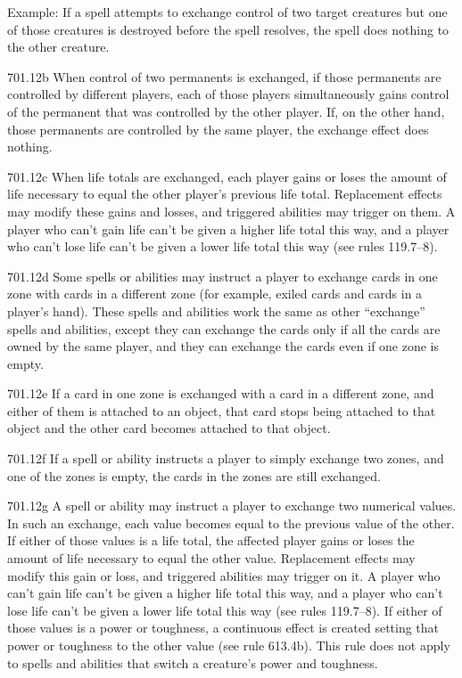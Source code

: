 Example: If a spell attempts to exchange control of two target creatures but one of those creatures is destroyed before the spell resolves, the spell does nothing to the other creature.

701.12b When control of two permanents is exchanged, if those permanents are controlled by different players, each of those players simultaneously gains control of the permanent that was controlled by the other player. If, on the other hand, those permanents are controlled by the same player, the exchange effect does nothing.

701.12c When life totals are exchanged, each player gains or loses the amount of life necessary to equal the other player’s previous life total. Replacement effects may modify these gains and losses, and triggered abilities may trigger on them. A player who can’t gain life can’t be given a higher life total this way, and a player who can’t lose life can’t be given a lower life total this way (see rules 119.7–8).

701.12d Some spells or abilities may instruct a player to exchange cards in one zone with cards in a different zone (for example, exiled cards and cards in a player’s hand). These spells and abilities work the same as other “exchange” spells and abilities, except they can exchange the cards only if all the cards are owned by the same player, and they can exchange the cards even if one zone is empty.

701.12e If a card in one zone is exchanged with a card in a different zone, and either of them is attached to an object, that card stops being attached to that object and the other card becomes attached to that object.

701.12f If a spell or ability instructs a player to simply exchange two zones, and one of the zones is empty, the cards in the zones are still exchanged.

701.12g A spell or ability may instruct a player to exchange two numerical values. In such an exchange, each value becomes equal to the previous value of the other. If either of those values is a life total, the affected player gains or loses the amount of life necessary to equal the other value. Replacement effects may modify this gain or loss, and triggered abilities may trigger on it. A player who can’t gain life can’t be given a higher life total this way, and a player who can’t lose life can’t be given a lower life total this way (see rules 119.7–8). If either of those values is a power or toughness, a continuous effect is created setting that power or toughness to the other value (see rule 613.4b). This rule does not apply to spells and abilities that switch a creature’s power and toughness.

